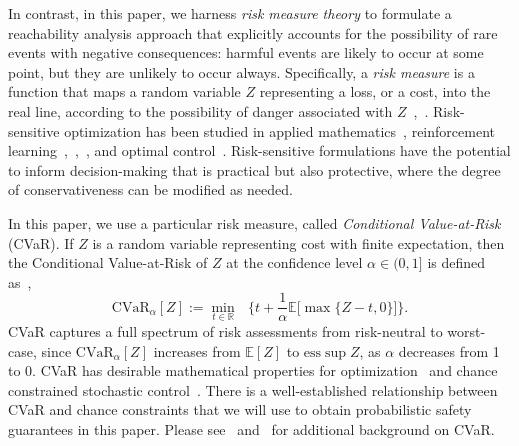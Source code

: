 \documentclass[letterpaper, 10 pt, conference]{ieeeconf}  %
\begin{document}
In contrast, in this paper, we harness \textit{risk measure theory} to formulate a reachability analysis approach that explicitly accounts for the possibility of rare events with negative consequences: 
harmful events are likely to occur at some point, but they are unlikely to occur always.
Specifically, a \textit{risk measure} is a function that maps a random variable $Z$ representing a loss, or a cost, into the real line,
according to the possibility of danger associated with $Z$~\cite[Sec. 6.3]{shapiro2009lectures},~\cite[Sec. 2.2]{kisiala2015conditional}.
Risk-sensitive optimization
has been studied in applied mathematics~\cite{ruszczynski2010risk}, reinforcement learning~\cite{osogami2012robustness},~\cite{chow2015risk},~\cite{ratliff2017risk}, and optimal control~\cite{chow2014framework}.
Risk-sensitive formulations have the potential to inform decision-making that is practical but also protective, where the degree of conservativeness can be modified as needed.

In this paper, we use a particular risk measure, called \textit{Conditional Value-at-Risk} (CVaR).
If $Z$ is a random variable representing cost with finite expectation, then the Conditional Value-at-Risk of $Z$ at the confidence level $\alpha \in (0,1]$
is defined as~\cite[Equation 6.22]{shapiro2009lectures},\footnotemark
{} 
\begin{equation}
\text{CVaR}_\alpha[Z] := {\underset{t \in \mathbb{R}}\min} \text{ }\Big\{ t + \frac{1}{\alpha}\mathbb{E}\big[\max\{Z-t,0\}\big] \Big\}.
\label{cvareqn}
\end{equation}
CVaR captures a full spectrum of risk assessments from risk-neutral to worst-case, since $\text{CVaR}_\alpha[Z]$ increases from $\mathbb{E}[Z]$ to $\text{ess}\sup Z$, as $\alpha$ decreases from 1 to 0.
CVaR has desirable mathematical properties for optimization~\cite{rockafellar2000optimization} and chance constrained stochastic control~\cite{vitus2016stochastic}.
There is a well-established relationship between CVaR and chance constraints
that we will use to obtain probabilistic safety guarantees in this paper.
Please see~\cite{kisiala2015conditional} and~\cite{serraino2013conditional} for additional background on CVaR.
\end{document}
